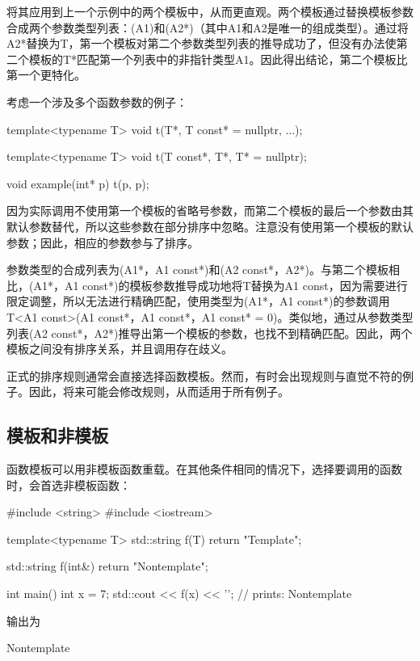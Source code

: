 将其应用到上一个示例中的两个模板中，从而更直观。两个模板通过替换模板参数合成两个参数类型列表：(A1)和(A2*)（其中A1和A2是唯一的组成类型）。通过将A2*替换为T，第一个模板对第二个参数类型列表的推导成功了，但没有办法使第二个模板的T*匹配第一个列表中的非指针类型A1。因此得出结论，第二个模板比第一个更特化。

考虑一个涉及多个函数参数的例子：

\begin{cpp}
template<typename T>
void t(T*, T const* = nullptr, ...);

template<typename T>
void t(T const*, T*, T* = nullptr);

void example(int* p) {
	t(p, p);
}
\end{cpp}

因为实际调用不使用第一个模板的省略号参数，而第二个模板的最后一个参数由其默认参数替代，所以这些参数在部分排序中忽略。注意没有使用第一个模板的默认参数；因此，相应的参数参与了排序。

参数类型的合成列表为(A1*，A1 const*)和(A2 const*，A2*)。与第二个模板相比，(A1*，A1 const*)的模板参数推导成功地将T替换为A1 const，因为需要进行限定调整，所以无法进行精确匹配，使用类型为(A1*，A1 const*)的参数调用T<A1 const>(A1 const*，A1 const*，A1 const* = 0)。类似地，通过从参数类型列表(A2 const*，A2*)推导出第一个模板的参数，也找不到精确匹配。因此，两个模板之间没有排序关系，并且调用存在歧义。

正式的排序规则通常会直接选择函数模板。然而，有时会出现规则与直觉不符的例子。因此，将来可能会修改规则，从而适用于所有例子。

\subsection{模板和非模板}

函数模板可以用非模板函数重载。在其他条件相同的情况下，选择要调用的函数时，会首选非模板函数：

\begin{cpp}
#include <string>
#include <iostream>

template<typename T>
std::string f(T) {
	return "Template";
}

std::string f(int&) {
	return "Nontemplate";
}

int main() {
	int x = 7;
	std::cout << f(x) << '\n'; // prints: Nontemplate
}
\end{cpp}

输出为

\begin{shell}
Nontemplate
\end{shell}

